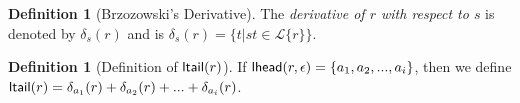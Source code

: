 \documentclass[11pt,leqno]{article}
\newtheorem{trthm}[tr]{Theorem}
\theoremstyle{definition}
\newtheorem{defn}[thm]{Definition}
\newcommand{\Lagr}{\mathcal{L}}
\newcommand{\lang}[1]{\Lagr\{#1\}}
\newcommand{\lhead}[1]{ {\sf lhead}(#1) }
\newcommand{\ltail}[1]{ {\sf ltail}(#1) }
\begin{document}
\begin{defn}[Brzozowski's Derivative]\label{def:derivative}
  The \emph{derivative of $r$ with respect to $s$} is denoted by $\delta_s(r)$
  and is $\delta_s(r) = \{t | st \in \lang{r}\}$.
\end{defn}

\begin{defn}[Definition of $\ltail{r}$]
If $\lhead{r, \epsilon} = \{a_1, a_2, ..., a_i\}$, then  
we define $\ltail{r} = \delta_{a_1}(r) + \delta_{a_2}(r) + ... + \delta_{a_i}(r)$.
\end{defn}





\end{document}
